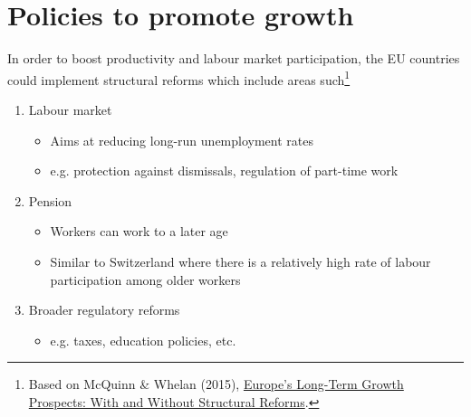 \documentclass{tufte-handout}
\begin{document}
\section{Policies to promote growth}
In order to boost productivity and labour market participation, the EU countries could implement structural reforms which include areas such\footnote{Based on McQuinn \& Whelan (2015), \href{http://www.karlwhelan.com/Papers/McQuinnWhelanMarch2015.pdf}{Europe's Long-Term Growth Prospects: With and Without Structural Reforms}.} 
\begin{enumerate}
  \item Labour market
  \begin{itemize}
    \item Aims at reducing long-run unemployment rates
    \item e.g. protection against dismissals, regulation of part-time work
  \end{itemize}
  \item Pension
  \begin{itemize}
    \item Workers can work to a later age
    \item Similar to Switzerland where there is a relatively high rate of labour participation among older workers
  \end{itemize}
  \item Broader regulatory reforms
  \begin{itemize}
    \item e.g. taxes, education policies, etc. 
  \end{itemize}
\end{enumerate}
\end{document}
